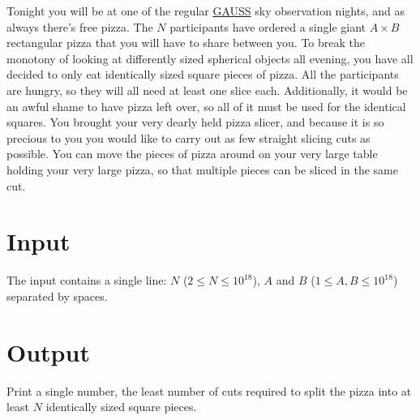\noindent
Tonight you will be at one of the regular \href{https://au.se/gauss/}{GAUSS} sky observation
nights, and as always there's free pizza.  The $N$ participants have ordered a single giant $A\times
B$ rectangular pizza that you will have to share between you. To break the monotony of looking at
differently sized spherical objects all evening, you have all decided to only eat identically sized
square pieces of pizza. All the participants are hungry, so they will all need at least one slice
each. Additionally, it would be an awful shame to have pizza left over, so all of it must be used
for the identical squares. You brought your very dearly held pizza slicer, and because it is so
precious to you you would like to carry out as few straight slicing cuts as possible. You can move
the pieces of pizza around on your very large table holding your very large pizza, so that multiple
pieces can be sliced in the same cut.

\section*{Input}

The input contains a single line: $N$ ($2 \le N \le 10^{18}$), $A$ and $B$ ($1 \le A, B \le 10^{18}$)
separated by spaces.

\section*{Output}

Print a single number, the least number of cuts required to split the pizza into at least $N$
identically sized square pieces.
